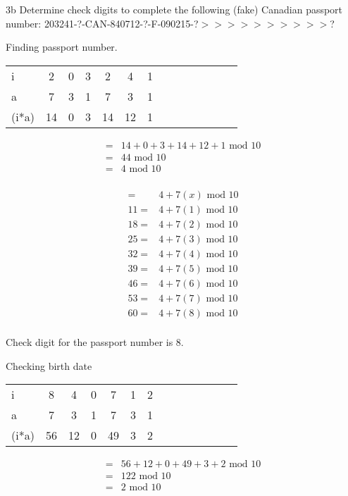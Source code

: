 \begin{question}{3b} %
Determine check digits to complete the following (fake) Canadian passport number:
203241-?-CAN-840712-?-F-090215-?$>>>>>>>>>>$?

Finding passport number.

\begin{tabular}{l|ccccccccccccc}
\hline
i     & 2 & 0 & 3 & 2 & 4 & 1\\
a     & 7 & 3 & 1 & 7 & 3 & 1\\
\hline
(i*a) & 14& 0 & 3 & 14& 12& 1
\end{tabular}

\begin{align*}
=& 14+ 0 + 3 + 14+ 12+ 1 \textrm{ mod } 10\\
=& 44\textrm{ mod } 10\\
=& 4 \textrm{ mod } 10\\
\end{align*}

\begin{align*}
=& 4 + 7(x)\textrm{ mod } 10\\
11 =& 4 + 7(1)\textrm{ mod } 10\\
18 =& 4 + 7(2)\textrm{ mod } 10\\
25 =& 4 + 7(3)\textrm{ mod } 10\\
32 =& 4 + 7(4)\textrm{ mod } 10\\
39 =& 4 + 7(5)\textrm{ mod } 10\\
46 =& 4 + 7(6)\textrm{ mod } 10\\
53 =& 4 + 7(7)\textrm{ mod } 10\\
60 =& 4 + 7(8)\textrm{ mod } 10\\
\end{align*}

Check digit for the passport number is 8.



Checking birth date

\begin{tabular}{l|ccccccccccccc}
\hline
i     & 8  & 4  & 0  & 7  & 1  & 2 \\
a     & 7  & 3  & 1  & 7  & 3  & 1 \\
\hline
(i*a) & 56 & 12 & 0  & 49 & 3  & 2
\end{tabular}

\begin{align*}
=& 56 + 12 + 0 + 49 + 3 + 2 \textrm{ mod } 10\\
=& 122 \textrm{ mod } 10\\
=& 2 \textrm{ mod } 10
\end{align*}


\end{question}
